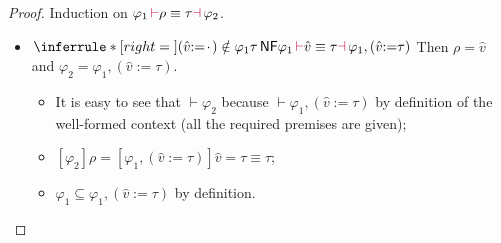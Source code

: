 \documentclass[a4,natbib=false]{article}
\newcommand{\ctxtapp}[2]{[{#1}] {#2}}
\newcommand{\evarassign}[2]{({#1} \mathsf{:=} {#2})}
\newcommand{\spcdot}{\mkern 2mu\cdot\mkern 2mu}
\newcommand{\judgectx}[2]{{#1} \vdash {#2}}
\newcommand{\judgeequivunt}[2]{{#1} \equiv {#2}}
\newcommand{\judgeunify}[4]{{#1}\,{\color{purple}\vdash} {#2} \equiv {#3} {\color{purple}\dashv}\,{#4}}
\newcommand{\judgeSnf}[1]{{#1}\,\mathsf{NF}}
\newcommand{\Infer}[3]{\inferrule*[right={#1}]{#2}{#3}}
\begin{document}
\begin{proof}
  Induction on $\judgeunify{\varphi_1}{\rho}{\tau}{\varphi_2}$.
  \begin{itemize}
    \item
      $
      \Infer{}
      { 
        \evarassign{\hat{v}}{\spcdot} \notin \varphi_1 \\
        \judgeSnf{\tau}
      }
      {
        \judgeunify{\varphi_1}{\hat{v}}{\tau}{\varphi_1, \evarassign{\hat{v}}{\tau}}
      }
      $
      Then $\rho = \hat{v}$ and $\varphi_2 = \varphi_1, \evarassign{\hat{v}}{\tau}$.
      \begin{itemize}
        \item It is easy to see that $\judgectx{}{\varphi_2}$ because
          $\judgectx{}{\varphi_1, \evarassign{\hat{v}}{\tau}}$  by definition of the
          well-formed context (all the required premises are given);
        \item $\judgeequivunt{\ctxtapp{\varphi_2}{\rho} = \ctxtapp{\varphi_1,
            \evarassign{\hat{v}}{\tau}}{\hat{v}} = \tau}{\tau}$;
        \item $\varphi_1 \subseteq \varphi_1, \evarassign{\hat{v}}{\tau}$ by definition.


\end{itemize}
\end{itemize}
\end{proof}
\end{document}
